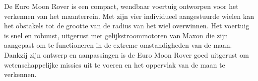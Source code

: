 De Euro Moon Rover is een compact, wendbaar voertuig ontworpen voor het verkennen van het maanterrein. Met zijn vier individueel aangestuurde wielen kan het obstakels tot de grootte van de radius van het wiel overwinnen. Het voertuig is snel en robuust, uitgerust met gelijkstroommotoren van Maxon die zijn aangepast om te functioneren in de extreme omstandigheden van de maan. Dankzij zijn ontwerp en aanpassingen is de Euro Moon Rover goed uitgerust om wetenschappelijke missies uit te voeren en het oppervlak van de maan te verkennen.
